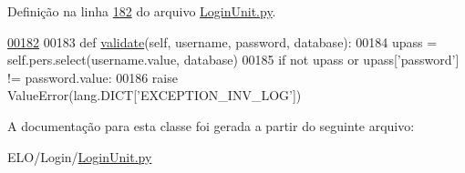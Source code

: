 Definição na linha \hyperlink{LoginUnit_8py_source_l00182}{182} do arquivo \hyperlink{LoginUnit_8py_source}{Login\-Unit.\-py}.


\begin{DoxyCode}
\hypertarget{classLogin_1_1LoginUnit_1_1BusLogin_l00182}{}\hyperlink{classLogin_1_1LoginUnit_1_1BusLogin_a2301425767b811697ce559801b955a58}{00182} 
00183     \textcolor{keyword}{def }\hyperlink{classLogin_1_1LoginUnit_1_1BusLogin_a2301425767b811697ce559801b955a58}{validate}(self, username, password, database):
00184         upass = self.pers.select(username.value, database)
00185         \textcolor{keywordflow}{if} \textcolor{keywordflow}{not} upass \textcolor{keywordflow}{or} upass[\textcolor{stringliteral}{'password'}] != password.value:
00186             \textcolor{keywordflow}{raise} ValueError(lang.DICT[\textcolor{stringliteral}{'EXCEPTION\_INV\_LOG'}])

\end{DoxyCode}


A documentação para esta classe foi gerada a partir do seguinte arquivo\-:\begin{DoxyCompactItemize}
\item 
E\-L\-O/\-Login/\hyperlink{LoginUnit_8py}{Login\-Unit.\-py}\end{DoxyCompactItemize}
